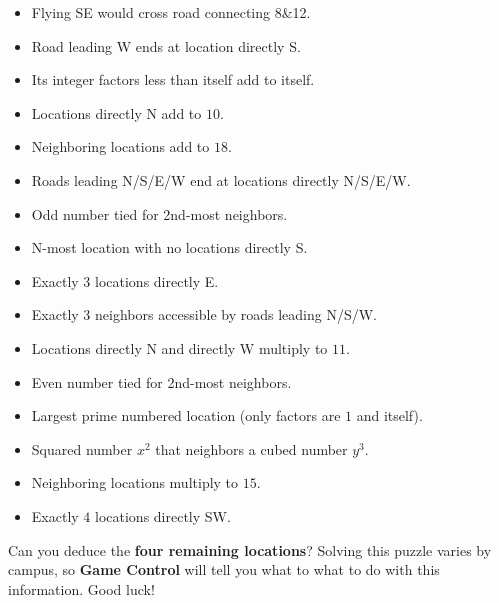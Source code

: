 \begin{multicols}{2}
  \begin{itemize}
    \item Flying SE would cross road connecting 8\&12. %
    \item Road leading W ends at location directly S. %
    \item Its integer factors less than itself add to itself. %
    \item Locations directly N add to \(10\). %
    \item Neighboring locations add to \(18\). %
    \item Roads leading N/S/E/W end at locations directly N/S/E/W. %
    \item Odd number tied for 2nd-most neighbors. %
    \item N-most location with no locations directly S. %
    \item Exactly \(3\) locations directly E. %
    \item Exactly \(3\) neighbors accessible by roads leading N/S/W. %
    \item Locations directly N and directly W multiply to \(11\). %
    \item Even number tied for 2nd-most neighbors. %
    \item Largest prime numbered location (only factors are \(1\) and itself). %
    \item Squared number \(x^2\) that neighbors a cubed number \(y^3\). %
    \item Neighboring locations multiply to \(15\). %
    \item Exactly \(4\) locations directly SW. %
  \end{itemize}
\end{multicols}

Can you deduce the \textbf{four remaining locations}?
Solving this puzzle varies by campus, so \textbf{Game Control}
will tell you what to what to do with this information. Good luck!




